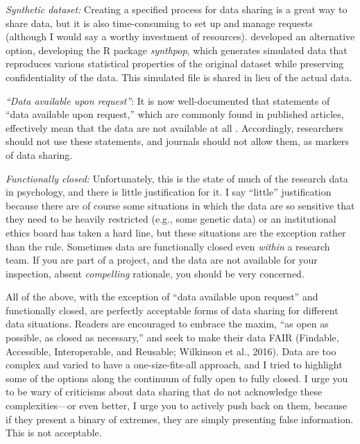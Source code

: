 \documentclass[authordate, empirical]{jote-new-article}
\begin{document}
\emph{Synthetic dataset:} Creating a specified process for data sharing is a great way to share data, but it is also time-consuming to set up and manage requests (although I would say a worthy investment of resources). \textcite{Quintana2020} developed an alternative option, developing the R package \emph{synthpop}, which generates simulated data that reproduces various statistical properties of the original dataset while preserving confidentiality of the data. This simulated file is shared in lieu of the actual data.







\emph{“Data available upon request”}: It is now well-documented that statements of “data available upon request,” which are commonly found in published articles, effectively mean that the data are not available at all \parencites{Gabelica2022}{Miyakawa2020}{Wicherts2006}. Accordingly, researchers should not use these statements, and journals should not allow them, as markers of data sharing.







\emph{Functionally closed: }Unfortunately, this is the state of much of the research data in psychology, and there is little justification for it. I say “little” justification because there are of course some situations in which the data are so sensitive that they need to be heavily restricted (e.g., some genetic data) or an institutional ethics board has taken a hard line, but these situations are the exception rather than the rule. Sometimes data are functionally closed even \emph{within} a research team. If you are part of a project, and the data are not available for your inspection, absent \emph{compelling} rationale, you should be very concerned.







All of the above, with the exception of “data available upon request” and functionally closed, are perfectly acceptable forms of data sharing for different data situations. Readers are encouraged to embrace the maxim, “as open as possible, as closed as necessary,” and seek to make their data FAIR (Findable, Accessible, Interoperable, and Reusable; Wilkinson et al., 2016). Data are too complex and varied to have a one-size-fits-all approach, and I tried to highlight some of the options along the continuum of fully open to fully closed. I urge you to be wary of criticisms about data sharing that do not acknowledge these complexities—or even better, I urge you to actively push back on them, because if they present a binary of extremes, they are simply presenting false information. This is not acceptable.
\end{document}
